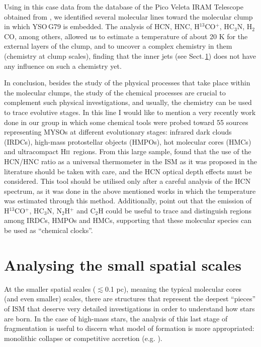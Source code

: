 \documentclass[baaa]{baaa}
\newcommand{\hii}{H\textsc{ii}}
\begin{document}
Using in this case data from the database of the Pico Veleta IRAM Telescope obtained from \citet{gerner14}, we identified several molecular lines toward the molecular clump in which YSO\,G79 is embedded. The analysis of HCN, HNC, H$^{13}$CO$^{+}$, HC$_{3}$N, H$_{2}$CO, among others, allowed us to estimate a temperature of about 20 K for the external layers of the clump, and to uncover a complex chemistry in them (chemistry at clump scales), finding that the inner jets (see Sect.\,\ref{small}) does not have any influence on such a chemistry yet.

In conclusion, besides the study of the physical processes that take place within the molecular clumps, the study of the chemical processes are crucial to complement such physical investigations, and usually, the chemistry can be used to trace evolutive stages. In this line I would like to mention a very recently work done in our group in 
which some chemical tools were probed toward 55 sources representing MYSOs at different evolutionary stages: infrared dark clouds (IRDCs), high-mass protostellar objects (HMPOs), hot molecular cores (HMCs) and ultracompact \hii~regions. From this large sample, \citet{martinez24}  
found that the use of the HCN/HNC ratio as a universal thermometer in the ISM as it was proposed in the literature should be taken with care, and the HCN optical depth effects must be considered. This tool should be utilised only after a careful analysis of the HCN spectrum, as it was done in the above mentioned works in which the temperature was estimated through this method.  Additionally, \citet{martinez24} point out that the emission of H$^{13}$CO$^{+}$, HC$_{3}$N, N$_{2}$H$^{+}$ and C$_{2}$H could be useful to trace and distinguish regions among IRDCs, HMPOs and HMCs, 
supporting that these molecular species can be used as ``chemical clocks''. 


\section{Analysing the small spatial scales} 
\label{small}

At the smaller spatial scales ($\lesssim$0.1 pc), meaning the typical molecular cores (and even smaller) scales, there are structures that 
represent the deepest ``pieces'' of ISM that deserve very detailed investigations in order to understand how stars are born. In the case of high-mass stars,
the analysis of this last stage of fragmentation is useful to discern what model of formation is more appropriated: monolithic collapse or competitive accretion (e.g. \citealt{motte18,palau2018,moscadelli2021}).
\end{document}
